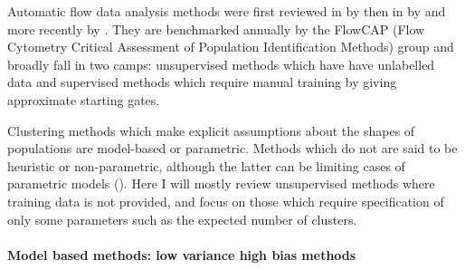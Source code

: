 Automatic flow data analysis methods were first reviewed in \citeyear{Bashashati:2009em} by \citeauthor{Bashashati:2009em} then in \citeyear{Lugli:2010ki} by \citeauthor{Lugli:2010ki}
and more recently by \citet{Aghaeepour:2013dg}.
They are benchmarked annually by the FlowCAP (Flow Cytometry Critical Assessment of Population Identification Methods)
group and broadly fall in two camps:
unsupervised methods which have have unlabelled data
and
supervised methods which require manual training by giving approximate starting gates.

Clustering methods which make explicit assumptions about the shapes of populations are model-based or parametric.
Methods which do not are said to be heuristic or non-parametric,
although the latter can be limiting cases of parametric models ().
Here I will mostly review unsupervised methods where training data is not provided,
and focus on those which require specification of only some parameters such as the expected
number of clusters.

\paragraph{Model based methods: low variance high bias methods}

